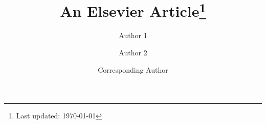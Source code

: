 \documentclass[review]{elsarticle}
\begin{document}
\begin{frontmatter}

    \title{An Elsevier Article\footnote{Last updated: \today}}
    
    \author[aff1]{Author 1}
    \author[aff1,aff2]{Author 2}
    \author[aff2]{Corresponding Author}
    
    \address[aff1]{Affiliation 1 address}
    \address[aff2]{Affiliation 2 address} 
    
    \begin{abstract}\end{abstract}
    
    \glsresetall

\end{frontmatter}

\linenumbers




\end{document}
